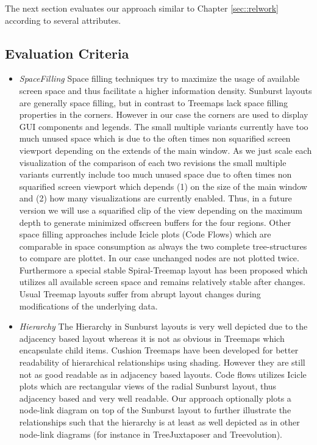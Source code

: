 The next section evaluates our approach similar to Chapter \ref{sec::relwork} according to several attributes.

\subsection{Evaluation Criteria}

\begin{itemize}
\item \emph{SpaceFilling} Space filling techniques try to maximize the usage of available screen space and thus facilitate a higher information density. Sunburst layouts are generally space filling, but in contrast to Treemaps lack space filling properties in the corners. However in our case the corners are used to display GUI components and legends. The small multiple variants currently have too much unused space which is due to the often times non squarified screen viewport depending on the extends of the main window. As we just scale each visualization of the comparison of each two revisions the small multiple variants currently include too much unused space due to often times non squarified screen viewport which depends (1) on the size of the main window and (2) how many visualizations are currently enabled. Thus, in a future version we will use a squarified clip of the view depending on the maximum depth to generate minimized offscreen buffers for the four regions. Other space filling approaches include Icicle plots (Code Flows) which are comparable in space consumption as always the two complete tree-structures to compare are plottet. In our case unchanged nodes are not plotted twice. Furthermore a special stable Spiral-Treemap layout has been proposed which utilizes all available screen space and remains relatively stable after changes. Usual Treemap layouts suffer from abrupt layout changes during modifications of the underlying data.
\item \emph{Hierarchy} The Hierarchy in Sunburst layouts is very well depicted due to the adjacency based layout whereas it is not as obvious in Treemaps which encapsulate child items. Cushion Treemaps have been developed for better readability of hierarchical relationships using shading. However they are still not as good readable as in adjacency based layouts. Code flows utilizes Icicle plots which are rectangular views of the radial Sunburst layout, thus adjacency based and very well readable. Our approach optionally plots a node-link diagram on top of the Sunburst layout to further illustrate the relationships such that the hierarchy is at least as well depicted as in other node-link diagrams (for instance in TreeJuxtaposer and Treevolution). 

\end{itemize}
